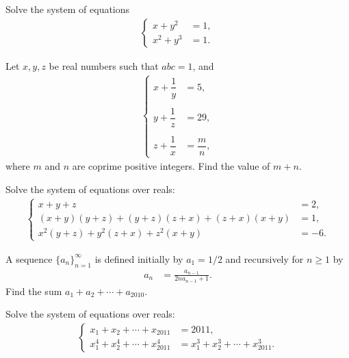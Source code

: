 \documentclass[12pt,a4paper]{memoir}
\theoremstyle{definition}
\begin{document}
\begin{question}[name={2008 Ecuador TST}]
	Solve the system of equations
	\begin{align*}
		\begin{cases}
			x+y^2 &= 1,\\ x^2+y^3 &= 1.
		\end{cases}
	\end{align*}
\end{question}



\begin{question}[name={2009 Ecuador TST}]
	Let $x,y,z$ be real numbers such that $abc=1$, and
	\begin{align*}
		\begin{cases}
			x+\dfrac{1}{y} &= 5,\\ & \\ y+\dfrac{1}{z} &= 29,\\ & \\ z+\dfrac{1}{x} &= \dfrac{m}{n},
		\end{cases}
	\end{align*}
	where $m$ and $n$ are coprime positive integers. Find the value of $m+n$.
\end{question}


\begin{question}[name={2009 Ecuador TST}]
	Solve the system of equations over reals:
	\begin{align*}
		\begin{cases}
			x+y+z &= 2,\\
			(x+y)(y+z) + (y+z)(z+x) + (z+x)(x+y) &= 1,\\
			x^2(y+z) + y^2(z+x) + z^2(x+y) &= -6.
		\end{cases}
	\end{align*}
\end{question}



\begin{question}[name={2010 Ecuador TST}]
	A sequence $\{a_n\}_{n=1}^{\infty}$ is defined initially by $a_1=1/2$ and recursively for $n\geq 1$ by
	\begin{align*}
		a_n &= \frac{a_{n-1}}{2na_{n-1}+1}.
	\end{align*}
	Find the sum $a_1+a_2+\cdots+a_{2010}$.
\end{question}



\begin{question}[name={2011 Ecuador TST}]
	Solve the system of equations over reals:
	\begin{align*}
		\begin{cases}
			x_1+x_2+\cdots+x_{2011} &= 2011,\\ x_1^4+x_2^4+\cdots+x_{2011}^4 & = x_1^3+x_2^3+\cdots+x_{2011}^3.
		\end{cases}
	\end{align*}
\end{question}
\end{document}
